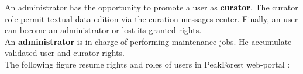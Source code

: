An administrator has the opportunity to promote a user as \textbf{curator}. The curator role permit textual data edition via the curation messages center. Finally, an user can become an administrator or lost its granted rights.\\

An \textbf{administrator} is in charge of performing maintenance jobs. He accumulate validated user and curator rights.\\


The following figure resume rights and roles of users in PeakForest web-portal :

\begin{figure}[htbp]
	\centering
\end{figure}

